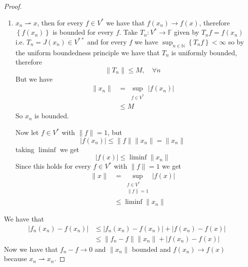 \documentclass[11pt,a4paper]{article}
\theoremstyle{definition}
\theoremstyle{plain}
\theoremstyle{remark}
\newcommand{\F}{\mathbb{F}}
\newcommand{\N}{\mathbb{N}}
\renewcommand{\set}[1]{\left\{ #1 \right\}}
\newcommand{\abs}[1]{\lvert #1 \rvert}
\newcommand{\norm}[1]{\lVert #1 \rVert}
\newcommand{\1}{\mathbbm{1}}
\newcommand{\wto}{\rightharpoonup}
\begin{document}
\begin{proof}
    \begin{enumerate}
        \item $x_n \wto x$, then for every $f \in V^*$ we have that $f(x_n) \to f(x)$, therefore $\set{f(x_n)}$ is bounded for every $f$. Take $T_n \colon V^* \to \F$ given 
        by $T_n f = f(x_n)$ i.e. $T_n = J(x_n) \in V^{**}$ and for every $f$ we have $\sup_{n \in \N} \set{T_n f} < \infty$ so by the uniform boundedness principle we have 
        that $T_n$ is uniformly bounded, therefore 
        $$\norm{T_n} \le M, \quad \forall n$$    
        But we have 
        \begin{align*}
            \norm{x_n} &= \sup_{\substack{f \in V^*}} \abs{f(x_n)} \\
            &\le M
        \end{align*}
        So $x_n$ is bounded. 

        Now let $f \in V^*$ with $\norm{f} = 1$, but 
        $$\abs{f(x_n)}  \le \norm{f} \norm{x_n} = \norm{x_n}$$
        taking $\liminf$ we get 
        $$\abs{f(x)} \le \liminf \norm{x_n}$$
        Since this holds for every $f \in V^*$ with $\norm{f} =1 $ we get 
        \begin{align*}
            \norm{x} &= \sup_{\substack{f \in V^* \\ \norm{f} = 1}} \abs{f(x)} \\
            &\le \liminf \norm{x_n}
        \end{align*}
    \end{enumerate}

    \item We have that 
    \begin{align*}
        \abs{f_n (x_n) - f(x_n)} &\le \abs{f_n (x_n) - f(x_n)} + \abs{f(x_n) - f(x)} \\
        &\le \norm{f_n - f}  \norm{x_n} + \abs{f(x_n) - f(x)}
    \end{align*}
    Now we have that $f_n - f \to 0$ and $\norm{x_n}$ bounded and $f(x_n) \to f(x)$ because $x_n \wto x_n$.
\end{proof}
\end{document}

